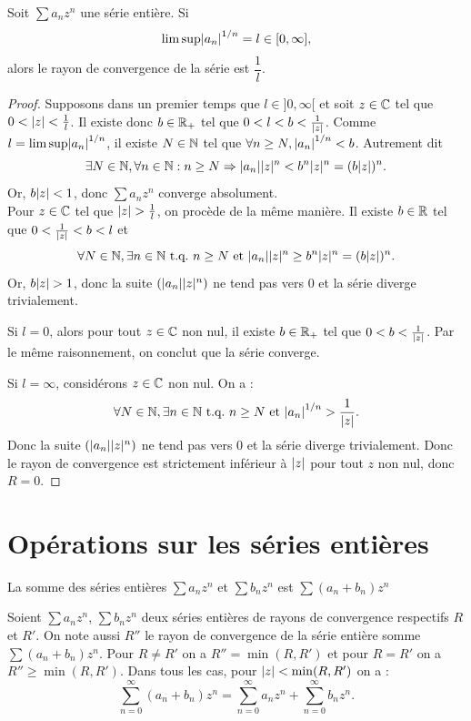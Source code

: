 \documentclass[french]{article}
\begin{document}
\begin{thm}[Hadamard]
Soit $\sum a_n z^n$ une série entière. Si 
\[ \limsup \abs*{a_n}^{1/n} = l \in [0, \infty], \]
alors le rayon de convergence de la série est $\dfrac1{l}$.
\end{thm}

\begin{proof}
Supposons dans un premier temps que $l \in ]0, \infty[$ et soit $z \in \Cx$ tel que $0 < \abs{z} < \frac1{l}$.
Il existe donc $b \in \Rp$ tel que $0 < l < b < \frac{1}{\abs{z}}$.
Comme $l = \limsup \abs*{a_n}^{1/n}$, il existe $N \in \N$ tel que $\forall n \geq N, \abs*{a_n}^{1/n} < b$.
Autrement dit 
\[ \exists N \in \N, \forall n \in \N : n \geq N \Rightarrow \abs*{a_n} \abs{z}^n < b^n \abs{z}^n = (b\abs{z})^n . \]
Or, $b\abs{z} < 1$, donc $\sum a_n z^n$ converge absolument. \\
Pour $z \in \Cx$ tel que $\abs{z} > \frac1{l}$, on procède de la même manière. Il existe $b \in \R$ tel que 
$0 < \frac{1}{\abs{z}} < b < l$ et 
\[ \forall N \in \N, \exists n \in \N \tq n \geq N \text{ et } \abs*{a_n} \abs{z}^n \geq b^n \abs{z}^n = (b\abs{z})^n . \]
Or, $b\abs{z} > 1$, donc la suite $(\abs{a_n} \abs{z}^n)$ ne tend pas vers 0 et la série diverge trivialement. \newline

Si $l=0$, alors pour tout $z \in \Cx$ non nul, il existe $b \in \Rp$ tel que $0 < b < \frac{1}{\abs{z}}$. 
Par le même raisonnement, on conclut que la série converge. \newline

Si $l=\infty$, considérons $z \in \Cx$ non nul. On a :
\[ \forall  N \in \N, \exists n \in \N \tq n \geq N \text{ et } \abs*{a_n}^{1/n} > \dfrac1{\abs{z}} . \]
Donc la suite $(\abs{a_n} \abs{z}^n)$ ne tend pas vers 0 et la série diverge trivialement. 
Donc le rayon de convergence est strictement inférieur à $\abs{z}$ pour tout $z$ non nul, donc $R=0$.
\end{proof}

\section{Opérations sur les séries entières}

\begin{defn}
La somme des séries entières $\sum a_n z^n$ et $\sum b_n z^n$ est $\sum (a_n + b_n) z^n$
\end{defn}

\begin{thm}
Soient $\sum a_n z^n$, $\sum b_n z^n$ deux séries entières de rayons de convergence respectifs $R$ et $R'$. On note aussi
$R''$ le rayon de convergence de la série entière somme $\sum (a_n + b_n) z^n$.
Pour $R \neq R'$ on a $R'' = \min(R, R')$ et pour $R=R'$ on a $R'' \geq \min(R,R')$. 
Dans tous les cas, pour $\abs{z} < \min(R, R')$ on a :
\[ \sum_{n=0}^{\infty}(a_n+b_n) z^n = \sum_{n=0}^{\infty}a_n z^n + \sum_{n=0}^{\infty}b_n z^n . \]
\end{thm}
\end{document}
